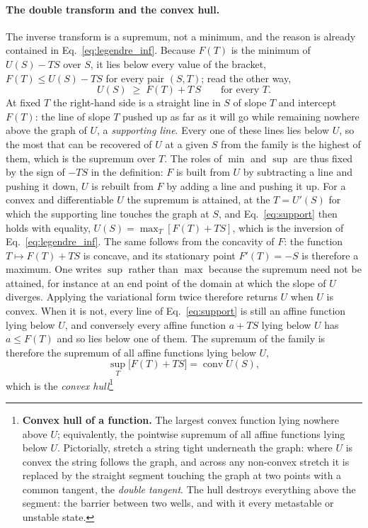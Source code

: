 \documentclass[10pt,a4paper]{article}
\theoremstyle{remark}
\begin{document}
\paragraph{The double transform and the convex hull.} The inverse transform
is a supremum, not a minimum, and the reason is already contained in
Eq.~\eqref{eq:legendre_inf}. Because $F(T)$ is the minimum of $U(S)-TS$ over
$S$, it lies below every value of the bracket, $F(T)\leq U(S)-TS$ for every
pair $(S,T)$; read the other way,
\begin{equation}\label{eq:support}
  U(S)\;\geq\;F(T)+T\,S\qquad\text{for every } T .
\end{equation}
At fixed $T$ the right-hand side is a straight line in $S$ of slope $T$ and
intercept $F(T)$: the line of slope $T$ pushed up as far as it will go while
remaining nowhere above the graph of $U$, a \emph{supporting line}. Every one
of these lines lies below $U$, so the most that can be recovered of $U$ at a
given $S$ from the family is the highest of them, which is the supremum over
$T$. The roles of $\min$ and $\sup$ are thus fixed by the sign of $-TS$ in the
definition: $F$ is built from $U$ by subtracting a line and pushing it down,
$U$ is rebuilt from $F$ by adding a line and pushing it up. For a convex and
differentiable $U$ the supremum is attained, at the $T=U'(S)$ for which the
supporting line touches the graph at $S$, and Eq.~\eqref{eq:support} then holds
with equality, $U(S)=\max_T[F(T)+TS]$, which is the inversion of
Eq.~\eqref{eq:legendre_inf}. The same follows from the concavity of $F$: the
function $T\mapsto F(T)+TS$ is concave, and its stationary point $F'(T)=-S$
is therefore a maximum. One writes $\sup$ rather than $\max$ because the
supremum need not be attained, for instance at an end point of the domain at
which the slope of $U$ diverges. Applying the variational form twice
therefore returns $U$ when $U$ is convex. When it is not, every line of
Eq.~\eqref{eq:support} is still an affine function lying below $U$, and
conversely every affine function $a+TS$ lying below $U$ has $a\leq F(T)$ and so
lies below one of them. The supremum of the family is therefore the supremum of
all affine functions lying below $U$,
\begin{equation}\label{eq:hull}
  \sup_T\big[F(T)+TS\big]=\operatorname{conv}U(S) ,
\end{equation}
which is the \emph{convex hull}\footnote{\label{fn:hull}\textbf{Convex hull of a
function.} The largest convex function lying nowhere above $U$; equivalently,
the pointwise supremum of all affine functions lying below $U$. Pictorially,
stretch a string tight underneath the graph: where $U$ is convex the string
follows the graph, and across any non-convex stretch it is replaced by the
straight segment touching the graph at two points with a common tangent, the
\emph{double tangent}. The hull destroys everything above the segment: the
barrier between two wells, and with it every metastable or unstable state.}
\end{document}
